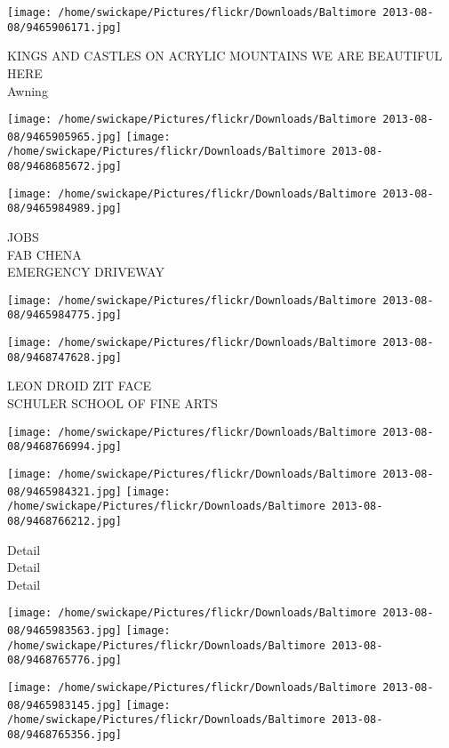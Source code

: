 \documentclass[10pt,letterpaper]{article}
\begin{document}
\vspace{0.25in}
\texttt{[image: /home/swickape/Pictures/flickr/Downloads/Baltimore 2013-08-08/9465906171.jpg]}

KINGS AND CASTLES ON ACRYLIC MOUNTAINS WE ARE BEAUTIFUL HERE\\
Awning
\pagebreak

\texttt{[image: /home/swickape/Pictures/flickr/Downloads/Baltimore 2013-08-08/9465905965.jpg]}
\texttt{[image: /home/swickape/Pictures/flickr/Downloads/Baltimore 2013-08-08/9468685672.jpg]}

\vspace{0.25in}
\texttt{[image: /home/swickape/Pictures/flickr/Downloads/Baltimore 2013-08-08/9465984989.jpg]}

JOBS\\
FAB CHENA\\
EMERGENCY DRIVEWAY
\pagebreak

\texttt{[image: /home/swickape/Pictures/flickr/Downloads/Baltimore 2013-08-08/9465984775.jpg]}

\vspace{0.25in}
\texttt{[image: /home/swickape/Pictures/flickr/Downloads/Baltimore 2013-08-08/9468747628.jpg]}

LEON DROID ZIT FACE\\
SCHULER SCHOOL OF FINE ARTS
\pagebreak

\texttt{[image: /home/swickape/Pictures/flickr/Downloads/Baltimore 2013-08-08/9468766994.jpg]}

\vspace{0.25in}
\texttt{[image: /home/swickape/Pictures/flickr/Downloads/Baltimore 2013-08-08/9465984321.jpg]}
\texttt{[image: /home/swickape/Pictures/flickr/Downloads/Baltimore 2013-08-08/9468766212.jpg]}

Detail\\
Detail\\
Detail
\pagebreak

\texttt{[image: /home/swickape/Pictures/flickr/Downloads/Baltimore 2013-08-08/9465983563.jpg]}
\texttt{[image: /home/swickape/Pictures/flickr/Downloads/Baltimore 2013-08-08/9468765776.jpg]}

\texttt{[image: /home/swickape/Pictures/flickr/Downloads/Baltimore 2013-08-08/9465983145.jpg]}
\texttt{[image: /home/swickape/Pictures/flickr/Downloads/Baltimore 2013-08-08/9468765356.jpg]}
\end{document}

